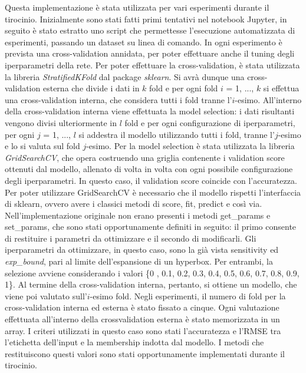 \documentclass[11pt,  oneside, openany]{book}
\begin{document}
Questa implementazione è stata utilizzata per vari esperimenti durante il tirocinio. Inizialmente sono stati fatti primi tentativi nel notebook Jupyter, in seguito è stato estratto uno script che permettesse l'esecuzione automatizzata di esperimenti, passando un dataset su linea di comando. In ogni esperimento è prevista una cross-validation annidata, per poter effettuare anche il tuning degli iperparametri della rete. Per poter effettuare la cross-validation, è stata utilizzata la libreria \textit{StratifiedKFold} dal package \textit{sklearn}. Si avrà dunque una cross-validation esterna che divide i dati in $k$ fold e per ogni fold $i$ = 1, ..., $k$ si effettua una cross-validation interna, che considera tutti i fold tranne l'$i$-esimo. All'interno della cross-validation interna viene effettuata la model selection: i dati risultanti vengono divisi ulteriormente in $l$ fold e per ogni configurazione di iperparametri, per ogni $j$ = 1, ..., $l$ si addestra il modello utilizzando tutti i fold, tranne l'$j$-esimo e lo si valuta sul fold $j$-esimo. Per la model selection è stata utilizzata la libreria \textit{GridSearchCV}, che opera costruendo una griglia contenente i validation score ottenuti dal modello, allenato di volta in volta con ogni possibile configurazione degli iperparametri. In questo caso, il validation score coincide con l'accuratezza. Per poter utilizzare GridSearchCV è necessario che il modello rispetti l'interfaccia di sklearn, ovvero avere i classici metodi di score, fit, predict e così via. Nell'implementazione originale non erano presenti i metodi get\_params e set\_params, che sono stati opportunamente definiti in seguito: il primo consente di restituire i parametri da ottimizzare e il secondo di modificarli. Gli iperparametri da ottimizzare, in questo caso, sono la già vista sensitivity ed \textit{exp\_bound}, pari al limite dell'espansione di un hyperbox. Per entrambi, la selezione avviene considerando i valori \{0 , 0.1, 0.2, 0.3, 0.4, 0.5, 0.6, 0.7, 0.8, 0.9, 1\}. Al termine della cross-validation interna, pertanto, si ottiene un modello, che viene poi valutato sull'$i$-esimo fold. Negli esperimenti, il numero di fold per la cross-validation interna ed esterna è stato fissato a cinque. Ogni valutazione effettuata all'interno della crossvalidation esterna è stato memorizzata in un array. I criteri utilizzati in questo caso sono stati l'accuratezza e l'RMSE tra l'etichetta dell'input e la membership indotta dal modello. I metodi che restituiscono questi valori sono stati opportunamente implementati durante il tirocinio. 
\end{document}
